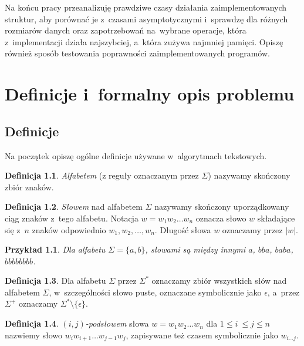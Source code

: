 \documentclass[declaration,shortabstract]{iithesis}
\theoremstyle{definition} \newtheorem{definition}{Definicja}[chapter]
\theoremstyle{plain} \newtheorem{remark}[definition]{Obserwacja}
\theoremstyle{plain} \newtheorem{theorem}[definition]{Twierdzenie}
\theoremstyle{plain} \newtheorem{example}{Przykład}[definition]
\theoremstyle{plain} \newtheorem{lemma}[definition]{Lemat}
\begin{document}
Na końcu pracy przeanalizuję prawdziwe czasy działania zaimplementowanych struktur, aby porównać je z~czasami asymptotycznymi i~sprawdzę dla różnych rozmiarów danych oraz zapotrzebowań na~wybrane operacje, która z~implementacji działa najszybciej, a~która zużywa najmniej pamięci. Opiszę również sposób testowania poprawności zaimplementowanych programów.

\chapter{Definicje i~formalny opis problemu}

\section{Definicje}

Na początek opiszę ogólne definicje używane w~algorytmach tekstowych.

\begin{definition}
    \textit{Alfabetem} (z reguły oznaczanym przez $\Sigma$) nazywamy skończony zbiór znaków.    
\end{definition}

\begin{definition}
    \textit{Słowem} nad alfabetem $\Sigma$ nazywamy skończony uporządkowany ciąg znaków z~tego alfabetu. Notacja $w = w_1 w_2 \ldots w_{n}$ oznacza słowo $w$ składające się z~$n$ znaków odpowiednio $w_1, w_2, \ldots, w_{n}$. Długość słowa $w$ oznaczamy przez $|w|$.
\end{definition}

\begin{example}
    Dla alfabetu $\Sigma = \{a, b\}$, słowami są między innymi $a$, $bba$, $baba$, $bbbbbbbb$.
\end{example}

\begin{definition}
    Dla alfabetu $\Sigma$ przez $\Sigma^*$ oznaczamy zbiór wszystkich słów nad alfabetem $\Sigma$, w~szczególności słowo puste, oznaczane symbolicznie jako $\epsilon$, a~przez $\Sigma^+$ oznaczamy $\Sigma^* \setminus \{ \epsilon \}$.
\end{definition}

\begin{definition}
    \textit{$(i, j)$-podsłowem} słowa $w = w_1 w_2 \ldots w_{n}$ dla $1 \leq i~\leq j \leq n$ nazwiemy słowo $w_i w_{i+1} \ldots w_{j-1} w_j$, zapisywane też czasem symbolicznie jako $w_{i \ldots j}$.
\end{definition}
\end{document}
